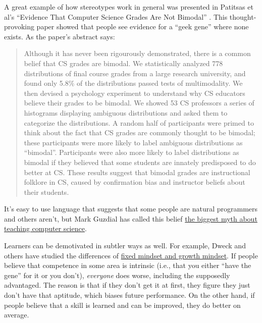 A great example of how stereotypes work in general was presented in
Patitsas et al's ``Evidence That Computer Science Grades Are Not
Bimodal'' \cite{bib:patitsas}.  This thought-provoking paper showed
that people see evidence for a ``geek gene'' where none exists.  As
the paper's abstract says:

\begin{quote}

  Although it has never been rigourously demonstrated, there is a
  common belief that CS grades are bimodal. We statistically analyzed
  778 distributions of final course grades from a large research
  university, and found only 5.8\% of the distributions passed tests
  of multimodality. We then devised a psychology experiment to
  understand why CS educators believe their grades to be bimodal. We
  showed 53 CS professors a series of histograms displaying ambiguous
  distributions and asked them to categorize the distributions. A
  random half of participants were primed to think about the fact that
  CS grades are commonly thought to be bimodal; these participants
  were more likely to label ambiguous distributions as ``bimodal''.
  Participants were also more likely to label distributions as bimodal
  if they believed that some students are innately predisposed to do
  better at CS. These results suggest that bimodal grades are
  instructional folklore in CS, caused by confirmation bias and
  instructor beliefs about their students.

\end{quote}

It's easy to use language that suggests that some people are natural
programmers and others aren't, but Mark Guzdial has called this belief
\href{http://cacm.acm.org/blogs/blog-cacm/189498-top-10-myths-about-teaching-computer-science/fulltext}{the
biggest myth about teaching computer science}.  


Learners can be demotivated in subtler ways as well. For example,
Dweck and others have studied the differences of
\href{https://en.wikipedia.org/wiki/Mindset\#Fixed\_mindset\_and\_growth\_mindset}{fixed
mindset and growth mindset}. If people believe that competence in some
area is intrinsic (i.e., that you either ``have the gene'' for it or you
don't), \emph{everyone} does worse, including the supposedly advantaged.
The reason is that if they don't get it at first, they figure they just
don't have that aptitude, which biases future performance. On the other
hand, if people believe that a skill is learned and can be improved,
they do better on average.


